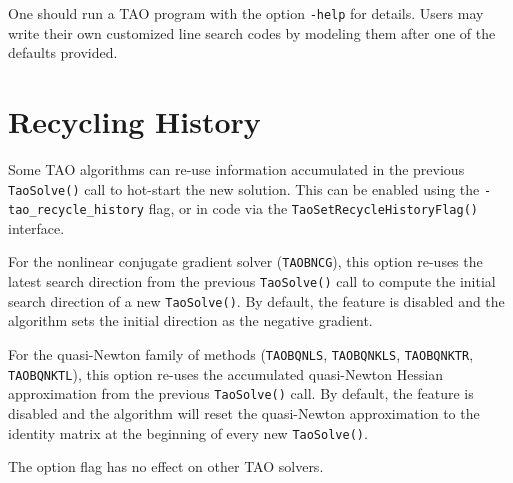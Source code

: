 One should run a TAO program with the option 
{\tt -help}
for details.  Users may write their own customized line search codes
by modeling them after one of the defaults provided.

\section{Recycling History} 
\label{sec_TaoRecycleHistory}

Some TAO algorithms can re-use information accumulated in the previous 
{\tt TaoSolve()} call to hot-start the new solution. This can be 
enabled using the {\tt -tao\_recycle\_history} flag, or in code via 
the {\tt TaoSetRecycleHistoryFlag()} interface.

For the nonlinear conjugate gradient solver ({\tt TAOBNCG}), this 
option re-uses the latest search direction from the previous 
{\tt TaoSolve()} call to compute the initial search direction of a 
new {\tt TaoSolve()}. By default, the feature is disabled and the 
algorithm sets the initial direction as the negative gradient.

For the quasi-Newton family of methods ({\tt TAOBQNLS}, {\tt TAOBQNKLS},
{\tt TAOBQNKTR}, {\tt TAOBQNKTL}), this option re-uses the accumulated 
quasi-Newton Hessian approximation from the previous {\tt TaoSolve()} call.
By default, the feature is disabled and the algorithm will reset the 
quasi-Newton approximation to the identity matrix at the beginning of 
every new {\tt TaoSolve()}.

The option flag has no effect on other TAO solvers.

